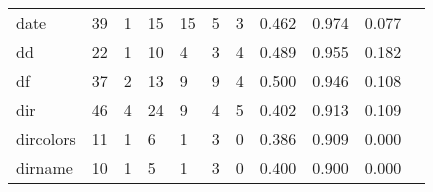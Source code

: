 \begin{longtable}{lp{1.2cm}p{1.2cm}p{1.2cm}p{1.2cm}p{1.2cm}p{1.2cm}p{1.2cm}p{1.2cm}p{1.2cm}p{1.2cm}}
date      &                                    39 &                                                  1 &                                                 15 &                                                 15 &                                                  5 &                                                  3 &                                              0.462 &                                              0.974 &                                              0.077 \\
dd        &                                    22 &                                                  1 &                                                 10 &                                                  4 &                                                  3 &                                                  4 &                                              0.489 &                                              0.955 &                                              0.182 \\
df        &                                    37 &                                                  2 &                                                 13 &                                                  9 &                                                  9 &                                                  4 &                                              0.500 &                                              0.946 &                                              0.108 \\
dir       &                                    46 &                                                  4 &                                                 24 &                                                  9 &                                                  4 &                                                  5 &                                              0.402 &                                              0.913 &                                              0.109 \\
dircolors &                                    11 &                                                  1 &                                                  6 &                                                  1 &                                                  3 &                                                  0 &                                              0.386 &                                              0.909 &                                              0.000 \\
dirname   &                                    10 &                                                  1 &                                                  5 &                                                  1 &                                                  3 &                                                  0 &                                              0.400 &                                              0.900 &                                              0.000 \\

\end{longtable}
